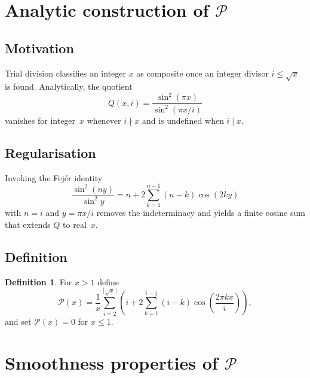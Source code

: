 \documentclass[11pt,a4paper]{amsart}
\newcommand{\Px}{\mathcal{P}}
\theoremstyle{plain}
\theoremstyle{definition}
\newtheorem{definition}[theorem]{Definition}
\begin{document}
\section{Analytic construction of $\Px$}

\subsection{Motivation}\label{subsec:motivation}
Trial division classifies an integer $x$ as composite once an integer divisor $i\le\sqrt{x}$ is found. Analytically, the quotient
\[
Q(x,i)=\frac{\sin^{2}(\pi x)}{\sin^{2}(\pi x/i)}
\]
vanishes for integer~$x$ whenever $i\nmid x$ and is undefined when $i\mid x$.
\subsection{Regularisation}
Invoking the Fejér identity
\[
\frac{\sin^{2}(ny)}{\sin^{2}y}=n+2\sum_{k=1}^{n-1}(n-k)\cos(2ky)
\]
with $n=i$ and $y=\pi x/i$ removes the indeterminacy and yields a finite cosine sum that extends $Q$ to real~$x$.

\subsection{Definition}
\begin{definition}\label{def:Px}
For $x>1$ define
\begin{equation}\label{eq:Px}
\Px(x)=\frac{1}{x}\sum_{i=2}^{\lceil\sqrt{x}\rceil}\left(i+2\sum_{k=1}^{i-1}(i-k)\cos\left(\frac{2\pi k x}{i}\right)\right),
\end{equation}
and set $\Px(x)=0$ for $x\le1$.
\end{definition}

\section{Smoothness properties of $\Px$}
\end{document}
